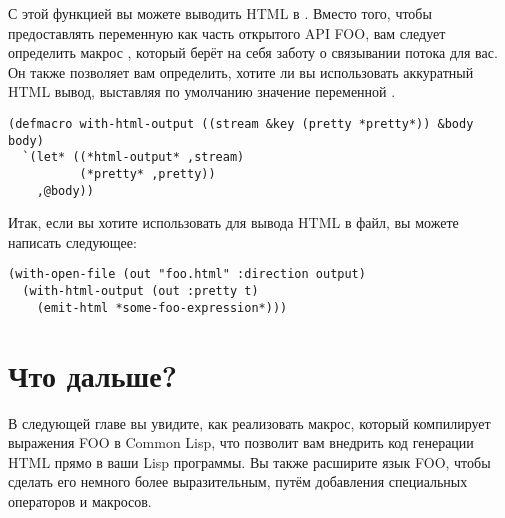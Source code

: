 С этой функцией вы можете выводить HTML в . Вместо того, чтобы
предоставлять переменную  как часть открытого API FOO, вам следует
определить макрос , который берёт на себя заботу о связывании
потока для вас. Он также позволяет вам определить, хотите ли вы использовать аккуратный
HTML вывод, выставляя по умолчанию значение переменной .

\begin{lstlisting}
(defmacro with-html-output ((stream &key (pretty *pretty*)) &body body)
  `(let* ((*html-output* ,stream)
          (*pretty* ,pretty))
    ,@body))
\end{lstlisting}

Итак, если вы хотите использовать  для вывода HTML в файл, вы можете
написать следующее:

\begin{lstlisting}
(with-open-file (out "foo.html" :direction output)
  (with-html-output (out :pretty t)
    (emit-html *some-foo-expression*)))
\end{lstlisting}

\section{Что дальше?}

В следующей главе вы увидите, как реализовать макрос, который компилирует выражения FOO в
Common Lisp, что позволит вам внедрить код генерации HTML прямо в ваши Lisp программы. Вы
также расширите язык FOO, чтобы сделать его немного более выразительным, путём добавления
специальных операторов и макросов.

